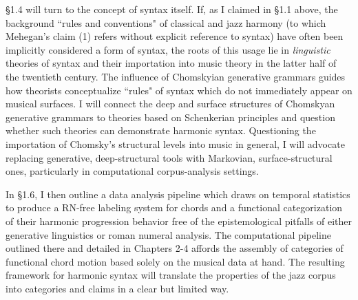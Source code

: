 \S 1.4 will turn to the concept of syntax itself.  If, as I claimed in \S 1.1 above, the background ``rules and conventions" of classical and jazz harmony (to which Mehegan's claim (1) refers without explicit reference to syntax) have often been implicitly considered a form of syntax, the roots of this usage lie in \emph{linguistic} theories of syntax and their importation into music theory in the latter half of the twentieth century. The influence of Chomskyian generative grammars guides how theorists conceptualize ``rules" of syntax which do not immediately appear on musical surfaces.  I will connect the deep and surface structures of Chomskyan generative grammars to theories based on Schenkerian principles and question whether such theories can demonstrate harmonic syntax.  Questioning the importation of Chomsky's structural levels into music in general, I will advocate replacing generative, deep-structural tools with Markovian, surface-structural ones, particularly in computational corpus-analysis settings.

In \S 1.6, I then outline a data analysis pipeline which draws on temporal statistics to produce a RN-free labeling system for chords and a functional categorization of their harmonic progression behavior free of the epistemological pitfalls of either generative linguistics or roman numeral analysis.  The computational pipeline outlined there and detailed in Chapters 2-4 affords the assembly of categories of functional chord motion based solely on the musical data at hand.  The resulting framework for harmonic syntax will translate the properties of the jazz corpus into categories and claims in a clear but limited way.

